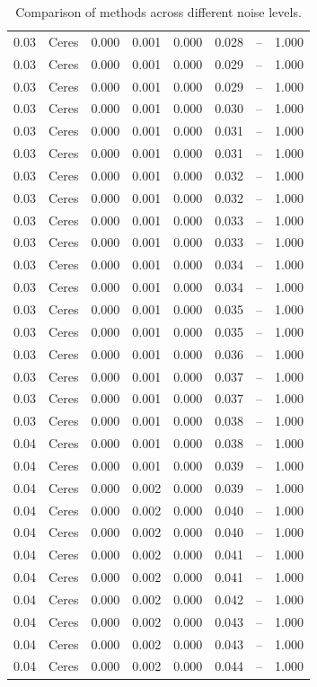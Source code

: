 \begin{table}[H]
\begin{tabular}{l c l l l}
0.03 & Ceres & 0.000 & 0.001 & 0.000 & 0.028 & -- & 1.000 \\
0.03 & Ceres & 0.000 & 0.001 & 0.000 & 0.029 & -- & 1.000 \\
0.03 & Ceres & 0.000 & 0.001 & 0.000 & 0.029 & -- & 1.000 \\
0.03 & Ceres & 0.000 & 0.001 & 0.000 & 0.030 & -- & 1.000 \\
0.03 & Ceres & 0.000 & 0.001 & 0.000 & 0.031 & -- & 1.000 \\
0.03 & Ceres & 0.000 & 0.001 & 0.000 & 0.031 & -- & 1.000 \\
0.03 & Ceres & 0.000 & 0.001 & 0.000 & 0.032 & -- & 1.000 \\
0.03 & Ceres & 0.000 & 0.001 & 0.000 & 0.032 & -- & 1.000 \\
0.03 & Ceres & 0.000 & 0.001 & 0.000 & 0.033 & -- & 1.000 \\
0.03 & Ceres & 0.000 & 0.001 & 0.000 & 0.033 & -- & 1.000 \\
0.03 & Ceres & 0.000 & 0.001 & 0.000 & 0.034 & -- & 1.000 \\
0.03 & Ceres & 0.000 & 0.001 & 0.000 & 0.034 & -- & 1.000 \\
0.03 & Ceres & 0.000 & 0.001 & 0.000 & 0.035 & -- & 1.000 \\
0.03 & Ceres & 0.000 & 0.001 & 0.000 & 0.035 & -- & 1.000 \\
0.03 & Ceres & 0.000 & 0.001 & 0.000 & 0.036 & -- & 1.000 \\
0.03 & Ceres & 0.000 & 0.001 & 0.000 & 0.037 & -- & 1.000 \\
0.03 & Ceres & 0.000 & 0.001 & 0.000 & 0.037 & -- & 1.000 \\
0.03 & Ceres & 0.000 & 0.001 & 0.000 & 0.038 & -- & 1.000 \\
0.04 & Ceres & 0.000 & 0.001 & 0.000 & 0.038 & -- & 1.000 \\
0.04 & Ceres & 0.000 & 0.001 & 0.000 & 0.039 & -- & 1.000 \\
0.04 & Ceres & 0.000 & 0.002 & 0.000 & 0.039 & -- & 1.000 \\
0.04 & Ceres & 0.000 & 0.002 & 0.000 & 0.040 & -- & 1.000 \\
0.04 & Ceres & 0.000 & 0.002 & 0.000 & 0.040 & -- & 1.000 \\
0.04 & Ceres & 0.000 & 0.002 & 0.000 & 0.041 & -- & 1.000 \\
0.04 & Ceres & 0.000 & 0.002 & 0.000 & 0.041 & -- & 1.000 \\
0.04 & Ceres & 0.000 & 0.002 & 0.000 & 0.042 & -- & 1.000 \\
0.04 & Ceres & 0.000 & 0.002 & 0.000 & 0.043 & -- & 1.000 \\
0.04 & Ceres & 0.000 & 0.002 & 0.000 & 0.043 & -- & 1.000 \\
0.04 & Ceres & 0.000 & 0.002 & 0.000 & 0.044 & -- & 1.000 \\
\midrule
\bottomrule
\end{tabular}
\label{tab:SyntheticNoise}
\caption{Comparison of methods across different noise levels.}
\end{table}
